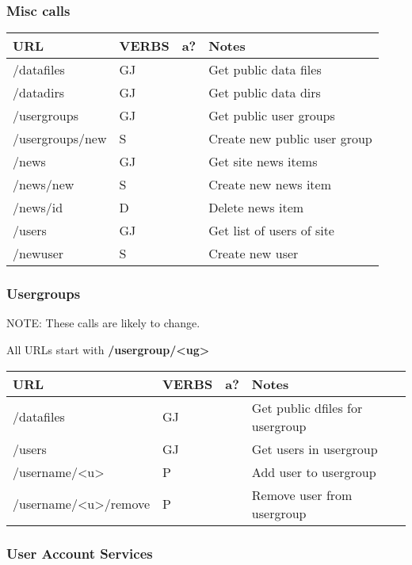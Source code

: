 \documentclass[11pt]{article}
\begin{document}
\subsubsection{Misc calls}
\label{sec-1-1-2}
\begin{center}
\begin{tabular}{llll}
URL & VERBS & a? & Notes\\
\hline
/datafiles & GJ &  & Get public data files\\
/datadirs & GJ &  & Get public data dirs\\
/usergroups & GJ &  & Get public user groups\\
/usergroups/new & S &  & Create new public user group\\
/news & GJ &  & Get site news items\\
/news/new & S &  & Create new news item\\
/news/id & D &  & Delete news item\\
/users & GJ &  & Get list of users of site\\
/newuser & S &  & Create new user\\
\end{tabular}
\end{center}
\subsubsection{Usergroups}
\label{sec-1-1-3}

NOTE: These calls are likely to change.

All URLs start with \textbf{/usergroup/<ug>}

\begin{center}
\begin{tabular}{llll}
URL & VERBS & a? & Notes\\
\hline
/datafiles & GJ &  & Get public dfiles for usergroup\\
/users & GJ &  & Get users in usergroup\\
/username/<u> & P &  & Add user to usergroup\\
/username/<u>/remove & P &  & Remove user from usergroup\\
\end{tabular}
\end{center}

\subsubsection{User Account Services}
\label{sec-1-1-4}
\end{document}
